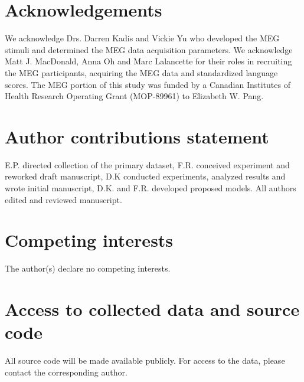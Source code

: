 \documentclass[fleqn,10pt]{wlscirep}
\begin{document}
\section*{Acknowledgements}

We acknowledge Drs. Darren Kadis and Vickie Yu who developed the MEG stimuli and determined the MEG data acquisition parameters. We acknowledge Matt J. MacDonald, Anna Oh and Marc Lalancette for their roles in recruiting the MEG participants, acquiring the MEG data and standardized language scores. The MEG portion of this study was funded by a Canadian Institutes of Health Research Operating Grant (MOP-89961) to Elizabeth W. Pang.

\section*{Author contributions statement}

E.P. directed collection of the primary dataset, F.R. conceived experiment and reworked draft manuscript, D.K conducted experiments, analyzed results and wrote initial manuscript, D.K. and F.R. developed proposed models. All authors edited and reviewed manuscript.

\section*{Competing interests}

The author(s) declare no competing interests.

\section*{Access to collected data and source code}

All source code will be made available publicly. For access to the data, please contact the corresponding author.
\end{document}
